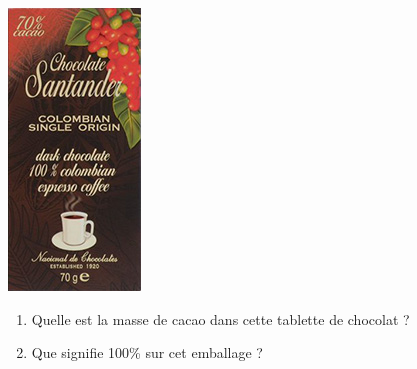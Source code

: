 
\begin{center}
\includegraphics[scale=0.5]{Prop-32.jpg}
\end{center}
\begin{enumerate}
\item Quelle est la masse de cacao dans cette tablette de chocolat ?
\item Que signifie 100\% sur cet emballage ?
\end{enumerate}